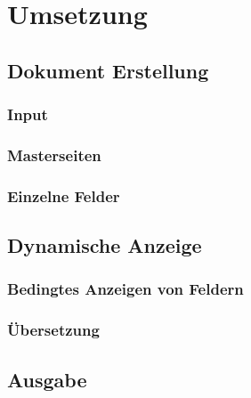 \chapter{Umsetzung}

\section{Dokument Erstellung}
\subsection{Input}
\subsection{Masterseiten}
\subsection{Einzelne Felder}

\section{Dynamische Anzeige}
\subsection{Bedingtes Anzeigen von Feldern}
\subsection{Übersetzung}

\section{Ausgabe}

